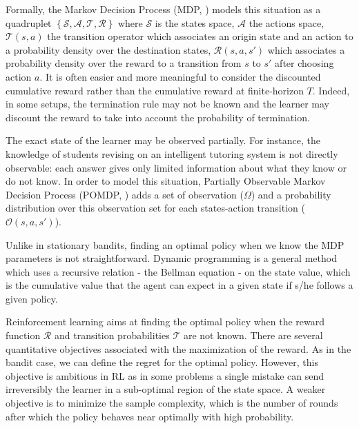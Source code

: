 {Formally, the Markov Decision Process (MDP, \cite{howard1960dynamic}) models this situation as a quadruplet $\left\{\mathcal{S}, \mathcal{A}, \mathcal{T},  \mathcal{R}\right\}$ where $\mathcal{S}$ is the states space, $\mathcal{A}$ the actions space, $\mathcal{T}(s, a)$ the transition operator which associates an origin state and an action to a probability density over the destination states, $\mathcal{R}(s, a ,s')$ which associates a probability density over the reward to a transition from $s$ to $s'$ after choosing action $a$. It is often easier and more meaningful to consider the discounted cumulative reward rather than the cumulative reward at finite-horizon $T$. Indeed, in some setups, the termination rule may not be known and the learner may discount the reward to take into account the probability of termination.

The exact state of the learner may be observed partially. For instance, the knowledge of students revising on an intelligent tutoring system is not directly observable: each answer gives only limited information about what they know or do not know. In order to model this situation, Partially Observable Markov Decision Process (POMDP, \cite{astrom1965optimal}) adds a set of observation ($\Omega$) and a probability distribution over this observation set for each states-action transition ($\mathcal{O}(s,a,s')$).

Unlike in stationary bandits, finding an optimal policy when we know the MDP parameters is not straightforward. Dynamic programming \citep{bellman1966dynamic} is a general method which uses a recursive relation -  the Bellman equation - on the state value, which is the cumulative value that the agent can expect in a given state if s/he follows a given policy.  

Reinforcement learning aims at finding the optimal policy when the reward function $\mathcal{R}$ and transition probabilities $\mathcal{T}$ are not known. There are several quantitative objectives associated with the maximization of the reward. As in the bandit case, we can define the regret for the optimal policy. However, this objective is ambitious in RL as in some problems a single mistake can send irreversibly the learner in a sub-optimal region of the state space. A weaker objective is to minimize the sample complexity, which is the number of rounds after which the policy behaves near optimally with high probability. 

}
